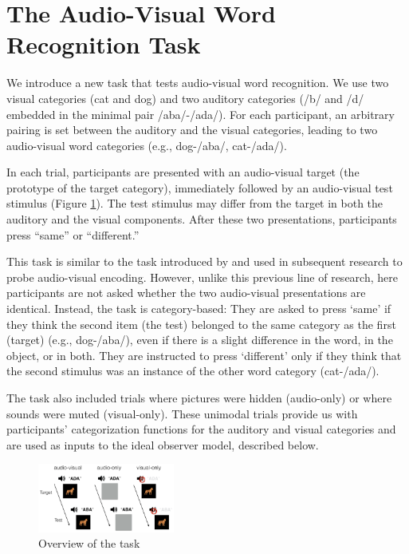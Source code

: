 \documentclass[10pt,letterpaper]{article}
\begin{document}
\section{The Audio-Visual Word Recognition Task}

We introduce a new task that tests audio-visual word recognition. We use two visual categories (cat and dog) and two auditory categories (/b/ and /d/ embedded in the minimal pair /aba/-/ada/). For each participant, an arbitrary pairing is set between the auditory and the visual categories, leading to two audio-visual word categories (e.g., dog-/aba/, cat-/ada/).

In each trial, participants are presented with an audio-visual target (the prototype of the target category), immediately followed by an audio-visual test stimulus (Figure \ref{fig:task}). The test stimulus may differ from the target in both the auditory and the visual components.  After these two presentations, participants press ``same'' or ``different.''

This task is similar to the task introduced by  and used in subsequent research to probe audio-visual encoding. However, unlike this previous line of research, here participants are not asked whether the two audio-visual presentations are identical. Instead, the task is category-based: They are asked to press `same' if they think the second item (the test) belonged to the same category as the first (target) (e.g.,  dog-/aba/), even if there is a slight difference in the word, in the object, or in both. They are instructed to press `different' only if they think that the second stimulus was an instance of the other word category (cat-/ada/).

The task also included trials where pictures were hidden (audio-only) or where sounds were muted (visual-only). These unimodal trials provide us with participants' categorization functions for the auditory and visual categories and are used as inputs to the ideal observer model, described below.

\begin{figure}[tp]
\centering
\includegraphics[width=0.4\textwidth]{task1.png}
\caption{Overview of the task}
\label{fig:task}
\end{figure}
\end{document}

